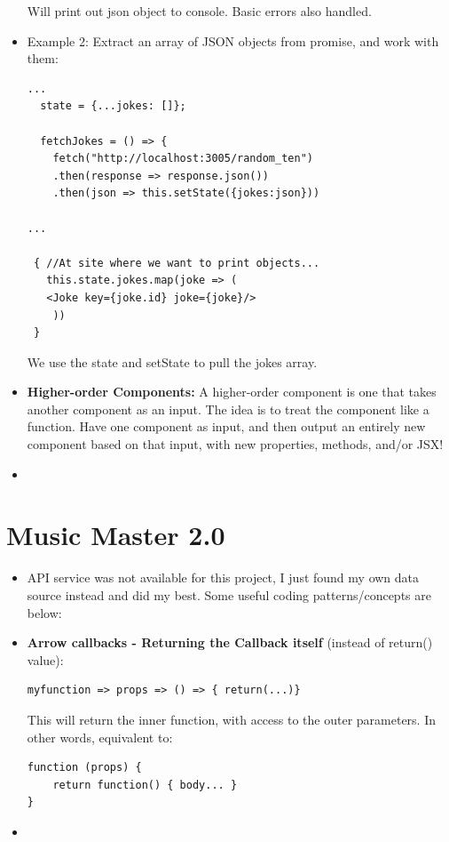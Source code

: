 \documentclass[8pt,a4paper]{extarticle}
\begin{document}
\begin{itemize}
Will print out json object to console. Basic errors also handled.

\item Example 2: Extract an array of JSON objects from promise, and work with them:

\begin{verbatim}
...
  state = {...jokes: []};

  fetchJokes = () => {
    fetch("http://localhost:3005/random_ten")
    .then(response => response.json())
    .then(json => this.setState({jokes:json}))

...

 { //At site where we want to print objects...
   this.state.jokes.map(joke => (
   <Joke key={joke.id} joke={joke}/>
    ))
 }
\end{verbatim}

We use the state and setState to pull the jokes array.

\item \textbf{Higher-order Components:} A higher-order component is one that takes another component as an input. The idea is to treat the component like a function. Have one component as input, and then output an entirely new component based on that input, with new properties, methods, and/or JSX!
\item
\end{itemize}

\section*{Music Master 2.0}

\begin{itemize}
\item API service was not available for this project, I just found my own data source instead and did my best. Some useful coding patterns/concepts are below:

\item \textbf{Arrow callbacks - Returning the Callback itself} (instead of return() value):

\begin{verbatim}
myfunction => props => () => { return(...)}
\end{verbatim}

This will return the inner function, with access to the outer parameters. In other words, equivalent to:

\begin{verbatim}
function (props) {
	return function() { body... }
}
\end{verbatim}
\item
\end{itemize}
\end{document}
